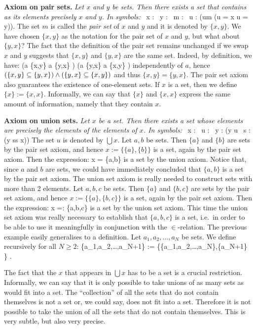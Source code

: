\textbf{Axiom on pair sets.} \emph{Let $x$ and $y$ be sets. Then there exists a set that contains as its elements precisely $x$ and $y$. In symbols:}
\bse
\forall \, x : \forall \, y : \exists \, m : \forall \, u : (u\in m \eqv (u = x \lor u = y)).
\ese
The set $m$ is called the \emph{pair set} of $x$ and $y$ and it is denoted by $\{x,y\}$.
\br
We have chosen $\{x,y\}$ as the notation for the pair set of $x$ and $y$, but what about $\{y,x\}$?
The fact that the definition of the pair set remains unchanged if we swap $x$ and $y$ suggests that $\{x,y\}$ and $\{y,x\}$ are the same set.
Indeed, by definition, we have:
\bse
(a \in \{x,y\} \imp a \in \{y,x\} ) \land (a \in \{y,x\} \imp a \in \{x,y\} ) 
\ese
independently of $a$, hence $(\{x,y\} \subseteq \{y,x\}) \land (\{y,x\} \subseteq \{x,y\})$ and thus $\{x,y\} = \{y,x\}$.
\er
\br
The pair set axiom also guarantees the existence of one-element sets. 
If $x$ is a set, then we define $\{x\}:=\{x,x\}$. Informally, we can say that $\{x\}$ and $\{x,x\}$ express the same amount of information, namely that they contain $x$. 
\er

\textbf{Axiom on union sets.} \emph{Let $x$ be a set. Then there exists a set whose elements are precisely the elements of the elements of $x$. In symbols:}
\bse
\forall \, x : \exists \, u : \forall \, y : (y \in u \eqv \exists \, s :(y \in s\land s \in x))
\ese
The set $u$ is denoted by $\bigcup x$.
\be
Let $a,b$ be sets. Then $\{a\}$ and $\{b\}$ are sets by the pair set axiom, and hence $x:=\{\{a\},\{b\}\}$ is a set, again by the pair set axiom. Then the expression:
\bse
\bigcup x = \{a,b\}
\ese
is a set by the union axiom.
\ee
Notice that, since $a$ and $b$ are sets, we could have immediately concluded that $\{a,b\}$ is a set by the pair set axiom. The union set axiom is really needed to construct sets with more than 2 elements.
\be
Let $a,b,c$ be sets. Then $\{a\}$ and $\{b,c\}$ are sets by the pair set axiom, and hence $x:=\{\{a\},\{b,c\}\}$ is a set, again by the pair set axiom. Then the expression:
\bse
\bigcup x =: \{a,b,c\}
\ese
is a set by the union set axiom. This time the union set axiom was really necessary to establish that $\{a,b,c\}$ is a set, i.e.\ in order to be able to use it meaningfully in conjunction with the $\in$-relation.
\ee
The previous example easily generalises to a definition.
\bd
Let $a_1,a_2,\ldots,a_N$ be sets. We define recursively for all $N\geq 2$:
\bse
\{a_1,a_2,\ldots,a_{N+1}\} := \bigcup \left\{\{a_1,a_2,\ldots,a_{N}\},\{a_{N+1}\} \right\} .
\ese
\ed

\br
The fact that the $x$ that appears in $\bigcup x$ has to be a set is a crucial restriction. Informally, we can say that it is only possible to take unions of as many sets as would fit into a set. The ``collection'' of all the sets that do not contain themselves is not a set or, we could say, does not fit into a set. Therefore it is not possible to take the union of all the sets that do not contain themselves. This is very subtle, but also very precise.
\er

